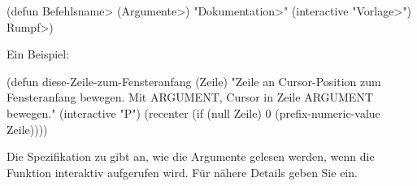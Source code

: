 \beginexample%
(defun \<Befehlsname> (\<Argumente>)
  "\<Dokumentation>"
  (interactive "\<Vorlage>")
  \<Rumpf>)
\endexample

Ein Beispiel:

\beginexample%
(defun diese-Zeile-zum-Fensteranfang (Zeile)
  "Zeile an Cursor-Position zum Fensteranfang bewegen.
Mit ARGUMENT, Cursor in Zeile ARGUMENT bewegen."
  (interactive "P")
  (recenter (if (null Zeile)
                0
              (prefix-numeric-value Zeile))))
\endexample

Die Spezifikation zu  gibt an, wie die Argumente
gelesen werden, wenn die Funktion inter\-aktiv auf\-ge\-ru\-fen
wird. F\"ur n\"ahere Details geben Sie  ein.

\copyrightnotice

\bye


